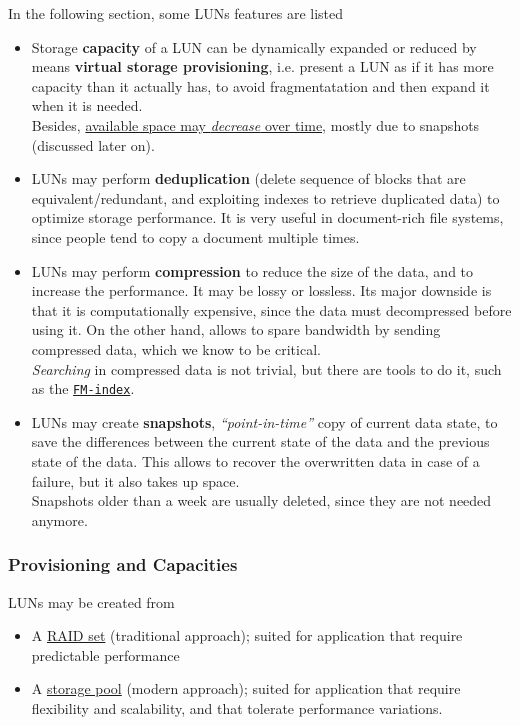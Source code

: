 In the following section, some LUNs features are listed
\begin{itemize}
   \item 
   Storage \textbf{capacity} of a LUN can be dynamically expanded or reduced
   by means \textbf{virtual storage provisioning}, i.e. present a LUN as if it has more capacity than it actually has, to avoid fragmentatation and then expand it when it is needed.\\
   Besides, \ul{available space may \textit{decrease} over time}, mostly due to snapshots (discussed later on).
   \item LUNs may perform \textbf{deduplication} (delete sequence of blocks that are equivalent/redundant, and exploiting indexes to retrieve duplicated data) to optimize storage performance. It is very useful in document-rich file systems, since people tend to copy a document multiple times.
   \item LUNs may perform \textbf{compression} to reduce the size of the data, and to increase the performance. It may be lossy or lossless.  Its major downside is that it is computationally expensive, since the data must decompressed before using it.
   On the other hand, allows to spare bandwidth by sending compressed data, which we know to be critical.\\
   \textit{Searching} in compressed data is not trivial, but there are tools to do it, such as the \href{https://en.wikipedia.org/wiki/FM-index}{\texttt{FM-index}}.
   \item LUNs may create \textbf{snapshots}, \textit{``point-in-time''} copy of current data state, to save the differences between the current state of the data and the previous state of the data. This allows to recover the overwritten data in case of a failure, but it also takes up space.\\
   Snapshots older than a week are usually deleted, since they are not needed anymore.
   
\end{itemize}

\subsubsection{Provisioning and Capacities}
LUNs may be created from\ns
\begin{itemize}
   \item A \ul{RAID set} (traditional approach); suited for application that require predictable performance
   \item A \ul{storage pool} (modern approach); suited for application that require flexibility and scalability, and that tolerate performance variations.
\end{itemize}

